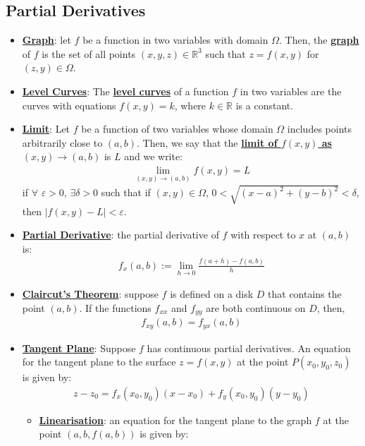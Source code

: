 \documentclass[reqno,11pt]{amsart}
\theoremstyle{definition}
\theoremstyle{remark}
\newcommand{\R}{\mathbb{R}}
\newcommand{\dfn}[1]{\underline{\textbf{#1}}}
\begin{document}
\subsection{Partial Derivatives}
\begin{itemize}[noitemsep]
	\item \dfn{Graph}: let $f$ be a function in two variables with domain $\Omega$. Then, the \dfn{graph} of $f$ is the set of all points $(x,y,z) \in \R^3$ such that $z = f(x,y)$ for $(z,y) \in \Omega$. 
	\item \dfn{Level Curves}: The \dfn{level curves} of a function $f$ in two variables are the curves with equations $f(x,y) = k$, where $k \in \R$ is a constant.
	\item \dfn{Limit}: Let $f$ be a function of two variables whose domain $\Omega$ includes points arbitrarily close to $(a,b)$. Then, we say that the \dfn{limit of $f(x,y)$ as $(x,y) \rightarrow (a,b)$} is $L$ and we write:
	\begin{align}
		\lim_{(x,y) \rightarrow (a,b)} f(x,y) = L	
	\end{align}
 	if $\forall$ $\varepsilon > 0$, $\exists \delta > 0$ such that if $(x,y) \in \Omega$, $0 < \sqrt{(x-a)^2 + (y-b)^2} < \delta$, then $|f(x,y) - L | < \varepsilon$. 
 	\item \dfn{Partial Derivative}: the partial derivative of $f$ with respect to $x$ at $(a,b)$ is: 
 	\begin{align}
 		f_x(a,b) := \lim_{h \rightarrow 0} \frac{f(a+h) - f(a,b)}{h}	
 	\end{align}
	\item \dfn{Claircut's Theorem}: suppose $f$ is defined on a disk $D$ that contains the point $(a,b)$. If the functions $f_{xx}$ and $f_{yy}$ are both continuous on $D$, then, 
	\begin{align}
		f_{xy} (a,b) = f_{yx} (a,b) 	
	\end{align}
 	\item \dfn{Tangent Plane}: Suppose $f$ has continuous partial derivatives. An equation for the tangent plane to the surface $z = f(x,y)$ at the point $P(x_0, y_0, z_0) $ is given by: 
 	\begin{align}
 		z - z_0 = f_x (x_0, y_0) (x-x_0) + f_y (x_0, y_0) (y-y_0 ) 	
 	\end{align}
	\begin{itemize}[noitemsep]
		\item \dfn{Linearisation}: an equation for the tangent plane to the graph $f$ at the point $(a,b, f(a,b))$ is given by: 
		\begin{align}

\end{align}
\end{itemize}
\end{itemize}
\end{document}

